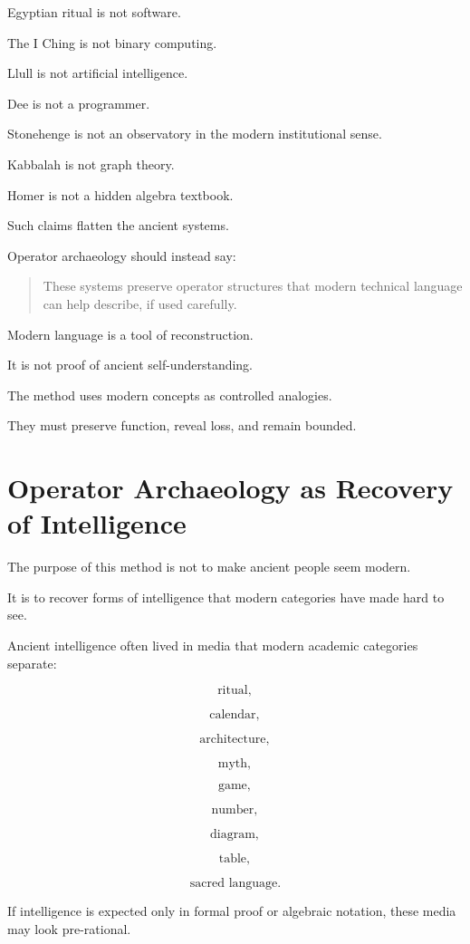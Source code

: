 \documentclass[11pt]{book}
\begin{document}
Egyptian ritual is not software.

The I Ching is not binary computing.

Llull is not artificial intelligence.

Dee is not a programmer.

Stonehenge is not an observatory in the modern institutional sense.

Kabbalah is not graph theory.

Homer is not a hidden algebra textbook.

Such claims flatten the ancient systems.

Operator archaeology should instead say:

\begin{quote}
These systems preserve operator structures that modern technical language can help describe, if used carefully.
\end{quote}

Modern language is a tool of reconstruction.

It is not proof of ancient self-understanding.

The method uses modern concepts as controlled analogies.

They must preserve function, reveal loss, and remain bounded.

\section{Operator Archaeology as Recovery of Intelligence}

The purpose of this method is not to make ancient people seem modern.

It is to recover forms of intelligence that modern categories have made hard to see.

Ancient intelligence often lived in media that modern academic categories separate:

\[
\text{ritual},
\]

\[
\text{calendar},
\]

\[
\text{architecture},
\]

\[
\text{myth},
\]

\[
\text{game},
\]

\[
\text{number},
\]

\[
\text{diagram},
\]

\[
\text{table},
\]

\[
\text{sacred language}.
\]

If intelligence is expected only in formal proof or algebraic notation, these media may look pre-rational.
\end{document}
